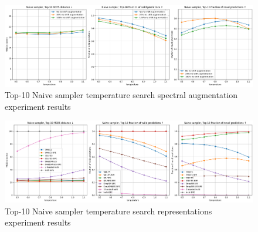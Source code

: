 \begin{figure}[h]
    \centering
    \includegraphics[width=1.0\textwidth]{figures/appendix/spectal_augmentation.png}
    \caption{Top-10 Naive sampler temperature search spectral augmentation experiment results}
    \label{fig:bpe_appendix}
\end{figure}

\begin{figure}[h]
    \centering
    \includegraphics[width=1.0\textwidth]{figures/appendix/representations.png}
    \caption{Top-10 Naive sampler temperature search representations experiment results}
    \label{fig:bpe_appendix}
\end{figure}